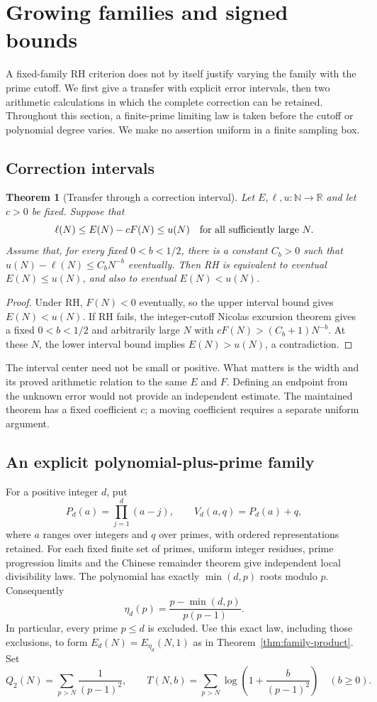 \documentclass[11pt]{article}
\newtheorem{theorem}{Theorem}[section]
\theoremstyle{definition}
\newcommand{\N}{\mathbb N}
\begin{document}
\section{Growing families and signed bounds}\label{sec:growing-families}

A fixed-family RH criterion does not by itself justify varying the family
with the prime cutoff. We first give a transfer with explicit error
intervals, then two arithmetic calculations in which the complete
correction can be retained. Throughout this section, a finite-prime
limiting law is taken before the cutoff or polynomial degree varies.
We make no assertion uniform in a finite sampling box.

\subsection{Correction intervals}
\begin{theorem}[Transfer through a correction interval]\label{thm:correction-interval}
Let $E,\ell,u:\N\to\mathbb R$ and let $c>0$ be fixed. Suppose that
\[
 \ell(N)\le E(N)-cF(N)\le u(N)
 \quad\hbox{for all sufficiently large }N.
\]
Assume that, for every fixed $0<b<1/2$, there is a constant $C_b>0$
such that $u(N)-\ell(N)\le C_bN^{-b}$ eventually.
Then RH is equivalent to eventual $E(N)\le u(N)$, and also to
eventual $E(N)<u(N)$.
\end{theorem}
\begin{proof}
Under RH, $F(N)<0$ eventually, so the upper interval bound gives
$E(N)<u(N)$. If RH fails, the integer-cutoff Nicolas excursion theorem
gives a fixed $0<b<1/2$ and arbitrarily large $N$ with
$cF(N)>(C_b+1)N^{-b}$. At these $N$, the lower interval bound implies
$E(N)>u(N)$, a contradiction.
\end{proof}
The interval center need not be small or positive. What matters is the
width and its proved arithmetic relation to the same $E$ and $F$.
Defining an endpoint from the unknown error would not provide an
independent estimate. The maintained theorem has a fixed coefficient
$c$; a moving coefficient requires a separate uniform argument.

\subsection{An explicit polynomial-plus-prime family}
For a positive integer $d$, put
\[
 P_d(a)=\prod_{j=1}^d(a-j),\qquad V_d(a,q)=P_d(a)+q,
\]
where $a$ ranges over integers and $q$ over primes, with ordered
representations retained. For each fixed finite set of primes, uniform
integer residues, prime progression limits and the Chinese remainder
theorem give independent local divisibility laws. The polynomial has
exactly $\min(d,p)$ roots modulo $p$. Consequently
\begin{equation}\label{eq:root-local-law}
 \eta_d(p)=\frac{p-\min(d,p)}{p(p-1)}.
\end{equation}
In particular, every prime $p\le d$ is excluded. Use this exact law,
including those exclusions, to form $E_d(N)=E_{\eta_d}(N,1)$ as in
Theorem~\ref{thm:family-product}. Set
\[
 Q_2(N)=\sum_{p>N}\frac1{(p-1)^2},\qquad
 T(N,b)=\sum_{p>N}\log\left(1+\frac b{(p-1)^2}\right)
 \quad(b\ge0).
\]
\end{document}
